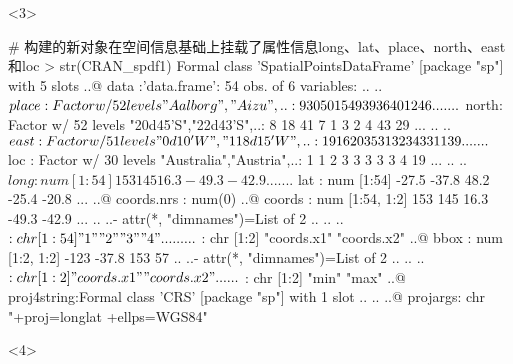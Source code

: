 \begin{frame}[t,fragile]{\subsecname}{\subsubsecname}
\begin{overlayarea}{\textwidth}{\textheight}
\begin{onlyenv}<3>
\begin{rcode}
# 构建的新对象在空间信息基础上挂载了属性信息long、lat、place、north、east和loc
> str(CRAN_spdf1)
Formal class 'SpatialPointsDataFrame' [package "sp"] with 5 slots
  ..@ data       :'data.frame': 54 obs. of  6 variables:
  .. ..$ place: Factor w/ 52 levels "Aalborg","Aizu",..: 9 30 50 15 49 39 36 40 12 46 ...
  .. ..$ north: Factor w/ 52 levels "20d45'S","22d43'S",..: 8 18 41 7 1 3 2 4 43 29 ...
  .. ..$ east : Factor w/ 51 levels "0d10'W","118d15'W",..: 19 16 20 35 31 32 34 33 11 39 ...
  .. ..$ loc  : Factor w/ 30 levels "Australia","Austria",..: 1 1 2 3 3 3 3 3 4 19 ...
  .. ..$ long : num [1:54] 153 145 16.3 -49.3 -42.9 ...
  .. ..$ lat  : num [1:54] -27.5 -37.8 48.2 -25.4 -20.8 ...
  ..@ coords.nrs : num(0) 
  ..@ coords     : num [1:54, 1:2] 153 145 16.3 -49.3 -42.9 ...
  .. ..- attr(*, "dimnames")=List of 2
  .. .. ..$ : chr [1:54] "1" "2" "3" "4" ...
  .. .. ..$ : chr [1:2] "coords.x1" "coords.x2"
  ..@ bbox       : num [1:2, 1:2] -123 -37.8 153 57
  .. ..- attr(*, "dimnames")=List of 2
  .. .. ..$ : chr [1:2] "coords.x1" "coords.x2"
  .. .. ..$ : chr [1:2] "min" "max"
  ..@ proj4string:Formal class 'CRS' [package "sp"] with 1 slot
  .. .. ..@ projargs: chr "+proj=longlat +ellps=WGS84"  
\end{rcode}
\end{onlyenv}

\begin{onlyenv}<4>
\end{onlyenv}
\end{overlayarea}
\end{frame}

